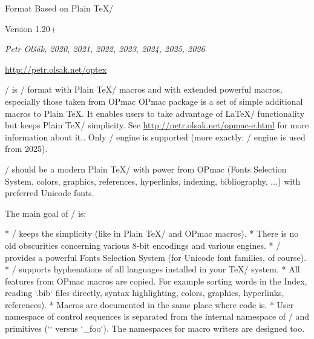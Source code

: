 

  \let\enddocument=\endinput

\typosize[10/12]  %

\begingroup \typosize [11/13.5] %



\centerline{\rm\OpTeX}
\vskip-8mm

\tit Format Based on Plain \TeX/

\hfill Version 1.20+

\centerline{\it Petr Olšák, 2020, 2021, 2022, 2023, 2024, 2025, 2026}

\bigskip
\centerline{\url{http://petr.olsak.net/optex}}

\bigskip
\noindent
\OpTeX/ is \LuaTeX/ format with Plain \TeX/ macros
and with extended powerful macros, especially those taken from OPmac\fnote
{OPmac package is a set of simple additional macros to Plain \TeX{}.
It enables users to take advantage of \LaTeX/ functionality but keeps
Plain \TeX/ simplicity. See
\url{http://petr.olsak.net/opmac-e.html} for more information about it.}.
Only \LuaTeX/ engine
is supported (more exactly: \LuaHBTeX/ engine is used from 2025).

\OpTeX/ should be a modern Plain \TeX/ with power from OPmac
(Fonts Selection System, colors, graphics, references, hyperlinks,
indexing, bibliography, ...) with preferred Unicode fonts.

The main goal of \OpTeX/ is:

\begitems
* \OpTeX/ keeps the simplicity (like in Plain \TeX/ and OPmac macros).
* There is no old obscurities concerning various 8-bit encodings and
  various engines.
* \OpTeX/ provides a powerful Fonts Selection System (for Unicode font
  families, of course).
* \OpTeX/ supports hyphenations of all languages installed in your \TeX/ system.
* All features from OPmac macros are copied. For example sorting words in
  the Index, reading `.bib` files directly, syntax 
  highlighting, colors, graphics, hyperlinks, references).
* Macros are documented in the same place where code is.
* User namespace of control sequences is separated from the internal namespace
  of \OpTeX/ and primitives (`\foo` versus `\_foo`).
  The namespaces for macro writers are designed too.
\enditems

